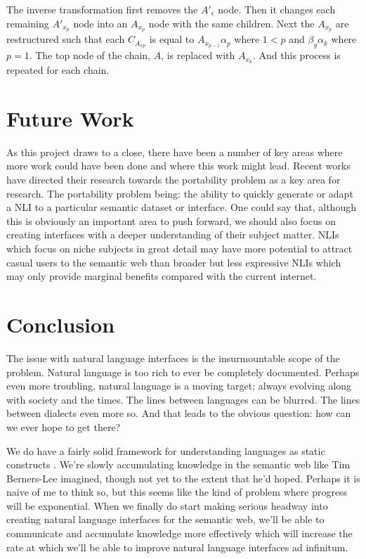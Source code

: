 \documentclass[11pt]{article}
\begin{document}
The inverse transformation first removes the $A'_\epsilon$ node. Then it changes each remaining $A'_{x_p}$ node into an $A_{x_p}$ node
with the same children. Next the $A_{x_p}$ are restructured such that each $C_{A_{x p}}$
is equal to $A_{x_{p-1}} \alpha_p$ where $1 < p$ and $\beta_y \alpha_k$ where $p=1$. The top node of the chain, 
$A$, is replaced with $A_{x_k}$. And this process is repeated for each chain.

\section{Future Work}
As this project draws to a close, there have been a number of key areas where more work
could have been done and where this work might lead. 
Recent works have directed their research towards the portability problem as a key area 
for research. The portability problem being: the ability to quickly generate or adapt 
a NLI to a particular semantic dataset or interface. 
One could say that, although this is obviously
an important area to push forward, we should also focus on creating interfaces with a
deeper understanding of their subject matter. NLIs which focus on niche subjects in great
detail may have more potential to attract casual users to the semantic web than broader
but less expressive NLIs which may only provide marginal benefits compared with the 
current internet.

\section{Conclusion}
The issue with natural language interfaces is the insurmountable scope of the problem. 
Natural language is too rich to ever be completely documented. Perhaps even more troubling,
natural language is a moving target; always evolving along with society and the times.
The lines between languages can be blurred. The lines between dialects even more so.
And that leads to the obvious question: how can we ever hope to get there?

We do have a fairly solid framework for understanding languages as static constructs
\cite{chomsky}. We're slowly accumulating knowledge in the semantic web like 
Tim Berners-Lee imagined, though not yet to the extent that he'd hoped. Perhaps it is
naive of me to think so, but this seems like the kind of problem where progress
will be exponential. When we finally do start making serious headway into creating
natural language interfaces for the semantic web, we'll be able to communicate and
accumulate knowledge more effectively which will increase the rate at which we'll be
able to improve natural language interfaces ad infinitum.
\end{document}
